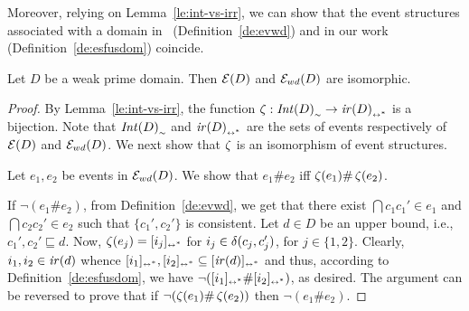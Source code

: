 Moreover, relying on Lemma~\ref{le:int-vs-irr}, we can
show that the event structures associated with a domain
in~\cite{Dro:ESD} (Definition~\ref{de:evwd}) and in our work (Definition~\ref{de:esfusdom})
coincide.

\begin{proposition}
  \label{pr:es-int}
  Let $D$ be a weak prime domain. Then $\mathcal{E}({D})$ and $\mathcal{E}_{wd}({D})$ are isomorphic.
\end{proposition}

\begin{proof}
  By Lemma~\ref{le:int-vs-irr}, the function
  $\mathop{\mathit{\zeta}} : {\mathop{\mathit{Int}({D})}}_{\scriptscriptstyle {\sim}} \to {\ensuremath{\mathop{\mathit{ir}({D})}}}_{\scriptscriptstyle {\leftrightarrow^*}}$ is a
  bijection. Note that ${\mathop{\mathit{Int}({D})}}_{\scriptscriptstyle {\sim}}$ and
  ${\mathop{\mathit{ir}({D})}}_{\scriptscriptstyle {\leftrightarrow^*}}$ are the sets of events respectively of
  $\mathcal{E}({D})$ and $\mathcal{E}_{wd}({D})$. We next show that $\mathop{\mathit{\zeta}}$ is an isomorphism
  of event structures.

  \medskip

  Let $e_1, e_2$ be events in $\mathcal{E}_{wd}({D})$. We show that $e_1 \# e_2$
  iff $\mathop{\mathit{\zeta}}(e_1) \# \mathop{\mathit{\zeta}}(e_2)$.
  
  If $\neg (e_1 \# e_2)$, from Definition~\ref{de:evwd}, we get that
  there exist $\dint{c_1}{c_1'} \in e_1$ and
  $\dint{c_2}{c_2'} \in e_2$ such that $\{ c_1', c_2' \}$ is
  consistent. Let $d \in D$ be an upper bound, i.e.,
  $c_1', c_2' \sqsubseteq d$. Now, $\mathop{\mathit{\zeta}}(e_j) = [{i_j}]_{\scriptscriptstyle {\leftrightarrow^*}}$ for
  $i_j \in \delta({c_j},{c_j'})$, for $j \in \{1,2\}$. Clearly,
  $i_1, i_2 \in \mathop{\mathit{ir}({d})}$ whence
  $[{i_1}]_{\scriptscriptstyle {\leftrightarrow^*}}, [{i_2}]_{\scriptscriptstyle {\leftrightarrow^*}} \subseteq [{\mathop{\mathit{ir}({d})}}]_{\scriptscriptstyle {\leftrightarrow^*}}$ and
  thus, according to Definition~\ref{de:esfusdom}, we have
  $\neg ([{i_1}]_{\scriptscriptstyle {\leftrightarrow^*}} \# [{i_2}]_{\scriptscriptstyle {\leftrightarrow^*}})$, as desired.
  The argument can be reversed to prove that if
  $\neg( \mathop{\mathit{\zeta}}(e_1) \# \mathop{\mathit{\zeta}}(e_2) )$ then $\neg (e_1 \# e_2)$.
  
  \medskip
  

\end{proof}
